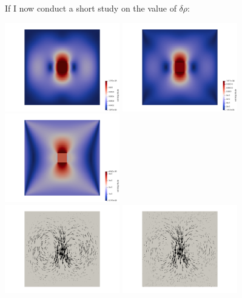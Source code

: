 If I now conduct a short study on the value of $\delta\rho$:

\begin{center}
\includegraphics[width=5cm]{python_codes/fieldstone_77/results/block/drho/vel1}
\includegraphics[width=5cm]{python_codes/fieldstone_77/results/block/drho/vel3}
\includegraphics[width=5cm]{python_codes/fieldstone_77/results/block/drho/vel2}\\
\includegraphics[width=5cm]{python_codes/fieldstone_77/results/block/drho/vels1}
\includegraphics[width=5cm]{python_codes/fieldstone_77/results/block/drho/vels3}

\end{center}
